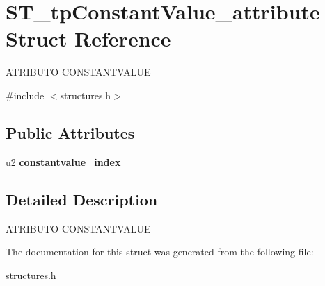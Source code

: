 \hypertarget{structST__tpConstantValue__attribute}{}\section{S\+T\+\_\+tp\+Constant\+Value\+\_\+attribute Struct Reference}
\label{structST__tpConstantValue__attribute}




 A\+T\+R\+I\+B\+U\+TO C\+O\+N\+S\+T\+A\+N\+T\+V\+A\+L\+UE  




{\ttfamily \#include $<$structures.\+h$>$}

\subsection*{Public Attributes}
\begin{DoxyCompactItemize}
\item 
\mbox{\label{structST__tpConstantValue__attribute_aceb4060697e676b134972861e0e038eb}} 
u2 {\bfseries constantvalue\+\_\+index}
\end{DoxyCompactItemize}


\subsection{Detailed Description}


 A\+T\+R\+I\+B\+U\+TO C\+O\+N\+S\+T\+A\+N\+T\+V\+A\+L\+UE 

The documentation for this struct was generated from the following file\+:\begin{DoxyCompactItemize}
\item 
\mbox{\hyperlink{structures_8h}{structures.\+h}}\end{DoxyCompactItemize}

